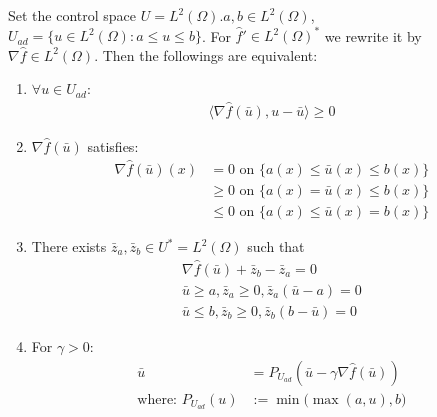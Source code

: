 \begin{lemma}
	Set the control space $U = L^2(\Omega)$.$a, b \in L^2(\Omega)$, $U_{ad} = \{u \in L^2(\Omega): a \le u \le b\}$.  For $\hat{f}' \in L^2(\Omega)^*$ we rewrite it by $\nabla \hat{f} \in L^2(\Omega)$. Then the followings are equivalent:
	\begin{enumerate}
		\item $\forall u \in U_{ad}:$
		\begin{align*}
			\langle \nabla \hat{f}(\bar{u}), u - \bar{u} \rangle \geq 0
		\end{align*}
		\item $\nabla \hat{f}(\bar{u})$ satisfies:
		\begin{align*}
			\nabla \hat{f}(\bar{u}) (x) 
			& = 0  \text{ on } \{a(x) \le \bar{u}(x) \le b(x)\}\\
			&\ge 0 \text{ on } \{a(x) = \bar{u}(x) \le b(x) \}\\
			&\le 0 \text{ on } \{a(x) \le \bar{u}(x) = b(x) \}
		\end{align*}
		\item There exists $\bar{z}_a,\bar{z}_b \in U^* = L^2(\Omega)$ such that 
		\begin{align*}
			\nabla \hat{f}(\bar{u}) + \bar{z}_b - \bar{z}_a = 0\\
			\bar{u} \ge a, \bar{z}_a \ge 0, \bar{z}_a (\bar{u} - a) = 0\\
			\bar{u} \le b, \bar{z}_b \ge 0, \bar{z}_b (b - \bar{u}) =0
		\end{align*}
		\item For $\gamma > 0$:
		\begin{align*}
			\bar{u} &= P_{U_{ad}} (\bar{u} - \gamma \nabla \hat{f}(\bar{u}))\\
			\text{where: } P_{U_{ad}}(u) &:= \min\bigg( \max(a, u), b\bigg)
		\end{align*}
	\end{enumerate}
\end{lemma}

